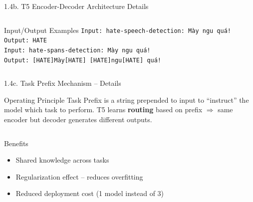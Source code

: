 \documentclass[11pt, aspectratio=169]{beamer}
\begin{document}
\begin{frame}[fragile, shrink=20]{1.4b. T5 Encoder-Decoder Architecture Details}
\begin{columns}[T]
  \vspace{0.2cm}
  \begin{block}{Input/Output Examples}
    \scriptsize
    \texttt{Input: hate-speech-detection: M\`ay ngu qu\'a!}\\
    \texttt{Output: HATE}\\[0.2em]
    \texttt{Input: hate-spans-detection: M\`ay ngu qu\'a!}\\
    \texttt{Output: [HATE]M\`ay[HATE] [HATE]ngu[HATE] qu\'a!}
  \end{block}
\end{columns}
\end{frame}

\begin{frame}[fragile, shrink=40]{1.4c. Task Prefix Mechanism -- Details}

\begin{block}{Operating Principle}
  Task Prefix is a string prepended to input to ``instruct'' the model which task to perform.
  T5 learns \textbf{routing} based on prefix $\Rightarrow$ same encoder but decoder generates different outputs.
\end{block}

\vspace{0.1cm}
\centering
{}

\vspace{0.3cm}
\begin{columns}[T]
  \begin{block}{Benefits}
    \begin{itemize}
      \item Shared knowledge across tasks
      \item Regularization effect -- reduces overfitting
      \item Reduced deployment cost (1 model instead of 3)
    \end{itemize}
  \end{block}


\end{columns}
\end{frame}
\end{document}
